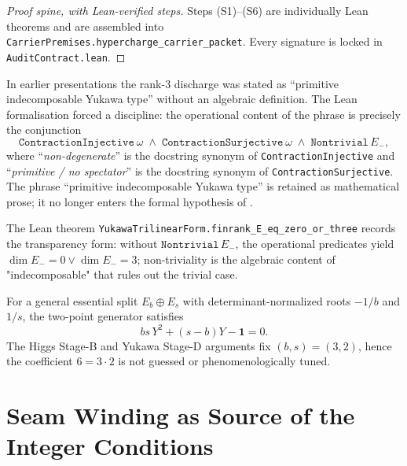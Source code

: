 \documentclass[11pt,a4paper]{article}
\begin{document}
\begin{proof}[Proof spine, with Lean-verified steps]
Steps (S1)--(S6) are individually Lean theorems and are
assembled into \texttt{CarrierPremises.hypercharge\_carrier\_packet}.
Every signature is locked in
\texttt{AuditContract.lean}.\qedhere
\end{proof}

\begin{remark}
\label{rem:primitive-yukawa-naming}
In earlier presentations the rank-$3$ discharge was stated as
``primitive indecomposable Yukawa type'' without an algebraic
definition. The Lean formalisation forced a discipline: the
operational content of the phrase is precisely the conjunction
\[
\texttt{ContractionInjective}\ \omega
\;\wedge\;
\texttt{ContractionSurjective}\ \omega
\;\wedge\;
\texttt{Nontrivial}\,E_-,
\]
where ``\emph{non-degenerate}'' is the docstring synonym of
\texttt{ContractionInjective} and ``\emph{primitive / no
spectator}'' is the docstring synonym of
\texttt{ContractionSurjective}. The phrase
``primitive indecomposable Yukawa type'' is retained as
mathematical prose; it no longer enters the formal hypothesis
of .

The Lean theorem
\texttt{YukawaTrilinearForm.finrank\_E\_eq\_zero\_or\_three}
records the transparency form: without
$\texttt{Nontrivial}\,E_-$, the operational predicates yield
$\dim E_- = 0 \vee \dim E_- = 3$; non-triviality is the
algebraic content of "indecomposable" that rules out the
trivial case.
\end{remark}

\begin{remark}
For a general essential split $E_b\oplus E_s$ with determinant-normalized roots
$-1/b$ and $1/s$, the two-point generator satisfies
\[
bs\,Y^2+(s-b)Y-\mathbf 1=0.
\]
The Higgs Stage-B and Yukawa Stage-D arguments fix $(b,s)=(3,2)$, hence the coefficient
$6=3\cdot2$ is not guessed or phenomenologically tuned.
\end{remark}

\section{Seam Winding as Source of the Integer Conditions}
\label{sec:seam-winding}
\end{document}
